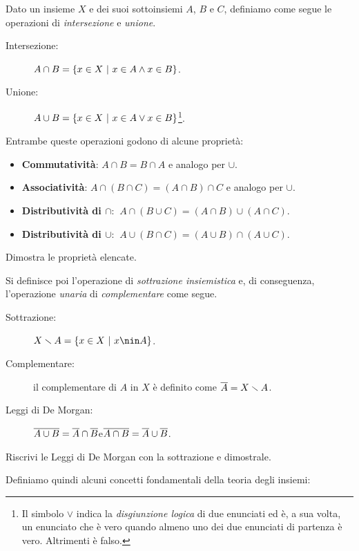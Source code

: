 		Dato un insieme $X$ e dei suoi sottoinsiemi $A$, $B$ e $C$, definiamo come segue le operazioni di \emph{intersezione} e \emph{unione}.
		\begin{description}
			\item[Intersezione:] $A\cap B=\{x\in X\ \rvert\  x\in A \land x\in B\}$.
			\item[Unione:] $A\cup B=\{x\in X\ \rvert\  x\in A \lor x\in B\}$\footnote{Il simbolo $\lor$ indica la \emph{disgiunzione logica} di due enunciati ed è, a sua volta, un enunciato che è vero quando almeno uno dei due enunciati di partenza è vero. Altrimenti è falso.}.
		\end{description}	
		Entrambe queste operazioni godono di alcune proprietà:
		\begin{itemize}
			\item \textbf{Commutatività}: $A\cap B=B\cap A$ e analogo per $\cup$.
			\item \textbf{Associatività}: $A\cap (B\cap C)=(A\cap B)\cap C$ e analogo per $\cup$.
			\item \textbf{Distributività di $\cap$}: $\ A\cap (B\cup C)=(A\cap B)\cup (A\cap C)$.
			\item \textbf{Distributività di $\cup$}: $\ A\cup (B\cap C)=(A\cup B)\cap (A\cup C)$.
		\end{itemize}
		\begin{es}
			Dimostra le proprietà elencate.
		\end{es}
		Si definisce poi l'operazione di \emph{sottrazione insiemistica} e, di conseguenza, l'operazione \emph{unaria} di \emph{complementare} come segue.
		\begin{description}
			\item[Sottrazione:] $X\smallsetminus A = \{x\in X\tc x\nin A\}$.
			\item[Complementare:] il complementare di $A$ in $X$ è definito come $\overline{A} =X\smallsetminus A$.
			\item[Leggi di De Morgan:] $\overline{A\cup B}=\overline{A}\cap\overline{B}$\quad e\quad $\overline{A\cap B}=\overline{A}\cup\overline{B}$.
		\end{description}
		\begin{es}
			Riscrivi le Leggi di De Morgan con la sottrazione e dimostrale.
		\end{es}
		Definiamo quindi alcuni concetti fondamentali della teoria degli insiemi:
